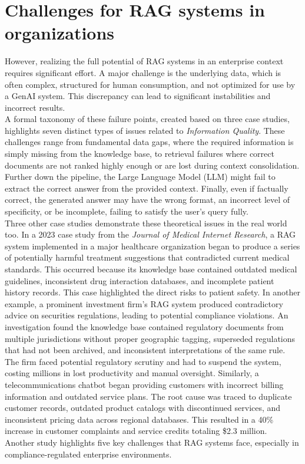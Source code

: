 \documentclass[
	english,
	ruledheaders=section,%
	class=report,%
	thesis={type=bachelor},%
	accentcolor=1b,%
	custommargins=true,%
	marginpar=false,%
	parskip=half-,%
	fontsize=11pt,%
	DIV=14,
]{tudapub}
\begin{document}
\section{Challenges for RAG systems in organizations}
However, realizing the full potential of RAG systems in an enterprise context requires significant effort. A major challenge is the underlying data, which is often complex, structured for human consumption, and not optimized for use by a GenAI system. This discrepancy can lead to significant instabilities and incorrect results.\\
A formal taxonomy of these failure points, created based on three case studies, highlights seven distinct types of issues related to \textit{Information Quality}. These challenges range from fundamental data gaps, where the required information is simply missing from the knowledge base, to retrieval failures where correct documents are not ranked highly enough or are lost during context consolidation. Further down the pipeline, the Large Language Model (LLM) might fail to extract the correct answer from the provided context. Finally, even if factually correct, the generated answer may have the wrong format, an incorrect level of specificity, or be incomplete, failing to satisfy the user's query fully.\\
Three other case studies demonstrate these theoretical issues in the real world too. In a 2023 case study from the \textit{Journal of Medical Internet Research}, a RAG system implemented in a major healthcare organization began to produce a series of potentially harmful treatment suggestions that contradicted current medical standards. This occurred because its knowledge base contained outdated medical guidelines, inconsistent drug interaction databases, and incomplete patient history records. This case highlighted the direct risks to patient safety. In another example, a prominent investment firm's RAG system produced contradictory advice on securities regulations, leading to potential compliance violations. An investigation found the knowledge base contained regulatory documents from multiple jurisdictions without proper geographic tagging, superseded regulations that had not been archived, and inconsistent interpretations of the same rule. The firm faced potential regulatory scrutiny and had to suspend the system, costing millions in lost productivity and manual oversight. Similarly, a telecommunications chatbot began providing customers with incorrect billing information and outdated service plans. The root cause was traced to duplicate customer records, outdated product catalogs with discontinued services, and inconsistent pricing data across regional databases. This resulted in a 40\% increase in customer complaints and service credits totaling \$2.3 million.\\
Another study highlights five key challenges that RAG systems face, especially in compliance-regulated enterprise environments.
\end{document}
